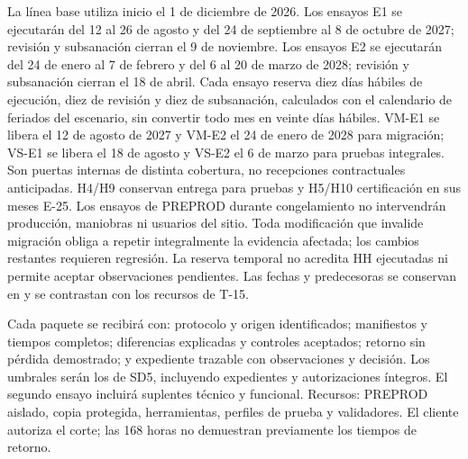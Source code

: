 La línea base utiliza inicio el 1 de diciembre de 2026. Los ensayos E1 se ejecutarán del 12 al 26 de agosto y del 24 de septiembre al 8 de octubre de 2027; revisión y subsanación cierran el 9 de noviembre. Los ensayos E2 se ejecutarán del 24 de enero al 7 de febrero y del 6 al 20 de marzo de 2028; revisión y subsanación cierran el 18 de abril. Cada ensayo reserva diez días hábiles de ejecución, diez de revisión y diez de subsanación, calculados con el calendario de feriados del escenario, sin convertir todo mes en veinte días hábiles. VM-E1 se libera el 12 de agosto de 2027 y VM-E2 el 24 de enero de 2028 para migración; VS-E1 se libera el 18 de agosto y VS-E2 el 6 de marzo para pruebas integrales. Son puertas internas de distinta cobertura, no recepciones contractuales anticipadas. H4/H9 conservan entrega para pruebas y H5/H10 certificación en sus meses E-25. Los ensayos de PREPROD durante congelamiento no intervendrán producción, maniobras ni usuarios del sitio. Toda modificación que invalide migración obliga a repetir integralmente la evidencia afectada; los cambios restantes requieren regresión. La reserva temporal no acredita HH ejecutadas ni permite aceptar observaciones pendientes. Las fechas y predecesoras se conservan en  y se contrastan con los recursos de T-15.~\parencite[arts.~17--18; Formulario~E-25; pp.~12--74]{bases-admin}

Cada paquete se recibirá con: protocolo y origen identificados; manifiestos y tiempos completos; diferencias explicadas y controles aceptados; retorno sin pérdida demostrado; y expediente trazable con observaciones y decisión. Los umbrales serán los de SD5, incluyendo expedientes y autorizaciones íntegros. El segundo ensayo incluirá suplentes técnico y funcional. Recursos: PREPROD aislado, copia protegida, herramientas, perfiles de prueba y validadores. El cliente autoriza el corte; las 168 horas no demuestran previamente los tiempos de retorno.

